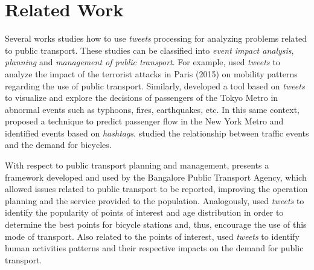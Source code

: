 \documentclass[runningheads]{llncs}
\begin{document}
\section{Related Work}
\label{relatedWorks}
%
Several works studies how to use \textit{tweets} processing for analyzing problems related to public transport. These studies can be classified into \emph{event impact analysis}, \emph{planning} and \emph{management of public transport}. For example, \cite{Wen2016} used \textit{tweets} to analyze the impact of the terrorist attacks in Paris (2015) on mobility patterns regarding the use of public transport. Similarly, \cite{Itoh2016} developed a tool based on \textit{tweets} to visualize and explore the decisions of passengers of the Tokyo Metro in abnormal events such as typhoons, fires, earthquakes, etc. In this same context, \cite{Ni2016} proposed a technique to predict passenger flow in the New York Metro and identified events based on \textit{hashtags}. \cite{Chen2016} studied the relationship between traffic events and the demand for bicycles.

With respect to public transport planning and management, \cite{Mukherjee2015} presents a framework developed and used by the Bangalore Public Transport Agency, which allowed issues related to public transport to be reported, improving the operation planning and the service provided to the population. Analogously, \cite{Gutev2016} used \textit{tweets} to identify the popularity of points of interest and age distribution in order to determine the best points for bicycle stations and, thus, encourage the use of this mode of transport. Also related to the points of interest, \cite{Maghrebi2015} used \textit{tweets} to identify human activities patterns and their respective impacts on the demand for public transport.
\end{document}
